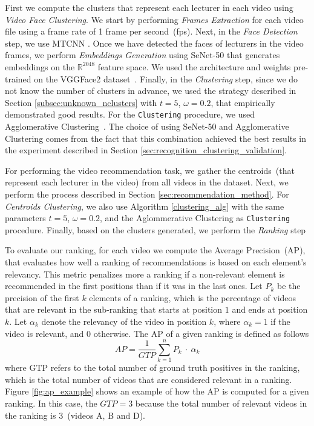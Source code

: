 First we compute the clusters that represent each lecturer in each video using \emph{Video Face Clustering}. 
We start by performing \emph{Frames Extraction} for each video file using a frame rate of 1 frame per second~(fps). 
Next, in the \emph{Face Detection} step, we use MTCNN \cite{mtcnn}.
Once we have detected the faces of lecturers in the video frames, we perform \emph{Embeddings Generation} using SeNet-50 \cite{senet} that generates embeddings on the $\mathbb{R}^{2048}$ feature space. 
We used the architecture and weights pre-trained on the VGGFace2 dataset~\cite{cao2018vggface2}.
Finally, in the \emph{Clustering} step, since we do not know the number of clusters in advance, we used the strategy described in Section \ref{subsec:unknown_nclusters} with $t=5$, $\omega=0.2$, that empirically demonstrated good results. For the \texttt{Clustering} procedure, we used Agglomerative Clustering~\cite{ward1963hierarchical}.
The choice of using SeNet-50 and Agglomerative Clustering comes from the fact that this combination achieved the best results in the experiment described in Section \ref{sec:recognition_clustering_validation}.

For performing the video recommendation task, we gather the centroids~(that represent each lecturer in the video) from all videos in the dataset. Next, we perform the process described in Section \ref{sec:recommendation_method}. For \emph{Centroids Clustering}, we also use Algorithm \ref{clustering_alg} with the same parameters $t=5$, $\omega=0.2$, and the Aglommerative Clustering as \texttt{Clustering} procedure. Finally, based on the clusters generated, we perform the \emph{Ranking} step

To evaluate our ranking, for each video we compute the Average Precision~(AP), that evaluates how well a ranking of recommendations is based on each element's relevancy. 
This metric penalizes more a ranking if a non-relevant element is recommended in the first positions than if it was in the last ones.
Let $P_k$ be the precision of the first $k$ elements of a ranking, which is the percentage of videos that are relevant in the sub-ranking that starts at position $1$ and ends at position $k$.
Let $\alpha_k$ denote the relevancy of the video in position $k$, where $\alpha_k = 1$ if the video is relevant, and $0$ otherwise.
The AP of a given ranking is defined as follows
\begin{equation}
  \label{equation:average_precision}
  AP = \frac{1}{GTP}\sum_{k=1}^{n}{P_k~\cdot~\alpha_k}
\end{equation}
where GTP refers to the total number of ground truth positives in the ranking, which is the total number of videos that are considered relevant in a ranking. Figure \ref{fig:ap_example} shows an example of how the AP is computed for a given ranking. In this case, the $GTP=3$ because the total number of relevant videos in the ranking is 3~(videos A, B and D).

